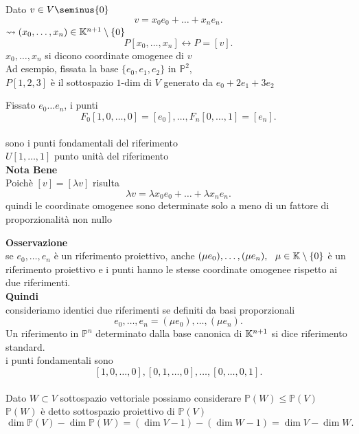 \documentclass[12px]{article}
\begin{document}
	Dato $v\in V\seminus\{0\}$
	 \[
	v= x_0e_0+\ldots +x_ne_n
	.\] 
	$\leadsto (x_0,\ldots,x_n)\in\mathbb{K}^{n+1}\setminus\{0\}$
	\[
		P[x_0,\ldots,x_n] \leftrightarrow P=[v]
	.\] 
	$x_0,\ldots,x_n$ si dicono coordinate omogenee di $v$
\\
Ad esempio, fissata la base $\{e_0,e_1,e_2\}$ in $\mathbb{P}^2$,\\
	$P[1,2,3]$ è il sottospazio $1 $-dim di $V$ generato da $e_0+2e_1+3e_2$\\
	\begin{nome}
		Fissato $e_0\ldots e_n$, i punti 
		\[
			F_0[1,0,\ldots,0] = [e_0],\ldots,F_n[0,\ldots,1]=[e_n] 
		.\] 
\\sono i punti fondamentali del riferimento\\
		$U[1,\ldots,1]$ punto unità del riferimento\\
		\textbf{Nota Bene}\\
		Poichè $[v] = [ \lambda v]$ risulta
		\[
		\lambda v = \lambda x_0e_0+\ldots+ \lambda x_n e_n
		.\] 
		quindi le coordinate omogenee sono determinate solo a meno di un fattore di proporzionalità non nullo
	\end{nome}
	\textbf{Osservazione}\\
	se $e_0,\ldots ,e_n$ è un riferimento proiettivo, anche  $(\mu e_0),\ldots,(\mu e_n), \ \ \mu\in\mathbb{K}\setminus\{0\}$ è un riferimento proiettivo e i punti hanno le stesse coordinate omogenee rispetto ai due riferimenti.\\
	\textbf{Quindi}\\
	consideriamo identici due riferimenti se definiti da basi proporzionali
	\[
	e_0,\ldots,e_n=(\mu e_0),\ldots,(\mu e_n)
	.\] 
	Un riferimento in $\mathbb{P}^n$ determinato dalla base canonica di $\mathbb{K}^{n+1}$ si dice riferimento standard. \\
	i punti fondamentali sono
	\[
		[1,0,\ldots,0],[0,1,\ldots,0],\ldots,[0,\ldots,0,1]
	.\] 
	\hline \ \\
	Dato $W\subset V$ sottospazio vettoriale possiamo considerare $\mathbb{P}(W)\leq \mathbb{P}(V)$\\
	$\mathbb{P}(W)$ è detto sottospazio proiettivo di $\mathbb{P}(V)$
	\[
		\dim\mathbb{P}(V)-\dim\mathbb{P}(W) = (\dim V-1) -(\dim W -1) = \dim V - \dim W
	.\] 
\end{document}
